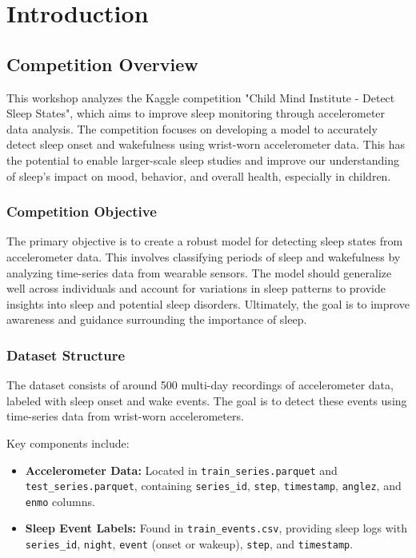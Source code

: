 \documentclass[conference]{IEEEtran}
\begin{document}
\section{Introduction}
\subsection{Competition Overview}

This workshop analyzes the Kaggle competition "Child Mind Institute - Detect Sleep States", which aims to improve sleep monitoring through accelerometer data analysis. The competition focuses on developing a model to accurately detect sleep onset and wakefulness using wrist-worn accelerometer data. This has the potential to enable larger-scale sleep studies and improve our understanding of sleep's impact on mood, behavior, and overall health, especially in children.

\subsubsection{Competition Objective}
The primary objective is to create a robust model for detecting sleep states from accelerometer data. This involves classifying periods of sleep and wakefulness by analyzing time-series data from wearable sensors. The model should generalize well across individuals and account for variations in sleep patterns to provide insights into sleep and potential sleep disorders. Ultimately, the goal is to improve awareness and guidance surrounding the importance of sleep.

\subsubsection{Dataset Structure}
The dataset consists of around 500 multi-day recordings of accelerometer data, labeled with sleep onset and wake events. The goal is to detect these events using time-series data from wrist-worn accelerometers.

Key components include:

\begin{itemize}
    \item \textbf{Accelerometer Data:} Located in \texttt{train\_series.parquet} and \texttt{test\_series.parquet}, containing \texttt{series\_id}, \texttt{step}, \texttt{timestamp}, \texttt{anglez}, and \texttt{enmo} columns.
    \item \textbf{Sleep Event Labels:} Found in \texttt{train\_events.csv}, providing sleep logs with \texttt{series\_id}, \texttt{night}, \texttt{event} (onset or wakeup), \texttt{step}, and \texttt{timestamp}.
\end{itemize}
\end{document}
